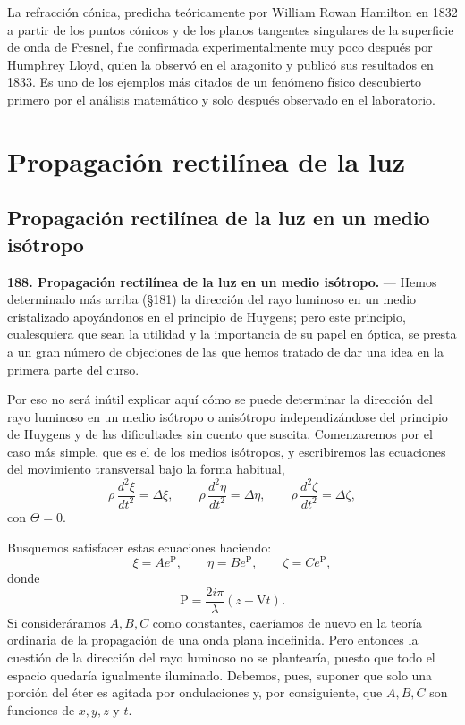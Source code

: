 \begin{notahistorica}
La refracción cónica, predicha teóricamente por William Rowan Hamilton en
1832 a partir de los puntos cónicos y de los planos tangentes singulares
de la superficie de onda de Fresnel, fue confirmada experimentalmente muy
poco después por Humphrey Lloyd, quien la observó en el aragonito y
publicó sus resultados en 1833. Es uno
de los ejemplos más citados de un fenómeno físico descubierto primero por
el análisis matemático y solo después observado en el laboratorio.
\end{notahistorica}

\section{Propagación rectilínea de la luz}

\subsection{Propagación rectilínea de la luz en un medio isótropo}

\noindent\textbf{188. Propagación rectilínea de la luz en un medio
isótropo.} — Hemos determinado más arriba (§181) la dirección del rayo
luminoso en un medio cristalizado apoyándonos en el principio de Huygens;
pero este principio, cualesquiera que sean la utilidad y la importancia de
su papel en óptica, se presta a un gran número de objeciones de las que
hemos tratado de dar una idea en la primera parte del curso.

Por eso no será inútil explicar aquí cómo se puede determinar la
dirección del rayo luminoso en un medio isótropo o anisótropo
independizándose del principio de Huygens y de las dificultades sin
cuento que suscita. Comenzaremos por el caso más simple, que es el de los
medios isótropos, y escribiremos las ecuaciones del movimiento
transversal bajo la forma habitual,
\[
\rho\,\frac{d^2\xi}{dt^2}=\Delta\xi,\qquad
\rho\,\frac{d^2\eta}{dt^2}=\Delta\eta,\qquad
\rho\,\frac{d^2\zeta}{dt^2}=\Delta\zeta,
\]
con $\Theta=0$.

Busquemos satisfacer estas ecuaciones haciendo:
\begin{equation}
\xi=Ae^{\mathrm P},\qquad \eta=Be^{\mathrm P},\qquad \zeta=Ce^{\mathrm P},
\tag{1}
\end{equation}
donde
\[
\mathrm P=\frac{2i\pi}{\lambda}(z-\mathrm Vt).
\]
Si consideráramos $A,B,C$ como constantes, caeríamos de nuevo en la
teoría ordinaria de la propagación de una onda plana indefinida. Pero
entonces la cuestión de la dirección del rayo luminoso no se plantearía,
puesto que todo el espacio quedaría igualmente iluminado. Debemos, pues,
suponer que solo una porción del éter es agitada por ondulaciones y, por
consiguiente, que $A,B,C$ son funciones de $x,y,z$ y $t$.

